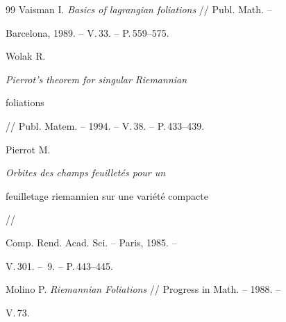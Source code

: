 \begin{thebibliography}{99}
Vaisman I. {\em Basics of lagrangian foliations} // Publ. Math. --


Barcelona, 1989. -- V.\,33. -- P.\,559--575.







Wolak R. {\em Pierrot's theorem for singular Riemannian


foliations} // Publ. Matem. -- 1994. -- V.\,38. -- P.\,433--439.







Pierrot M. {\em Orbites des champs feuillet\'es pour un


feuilletage riemannien sur une vari\'et\'e compacte} //


Comp. Rend. Acad. Sci. -- Paris, 1985. -- 


V.\,301. -- \No\,9. -- P.\,443--445.







Molino P. {\em Riemannian Foliations} // Progress in Math. -- 1988. --


V.\,73.







































\end{thebibliography}





\vskip 2cm












\label{end}








